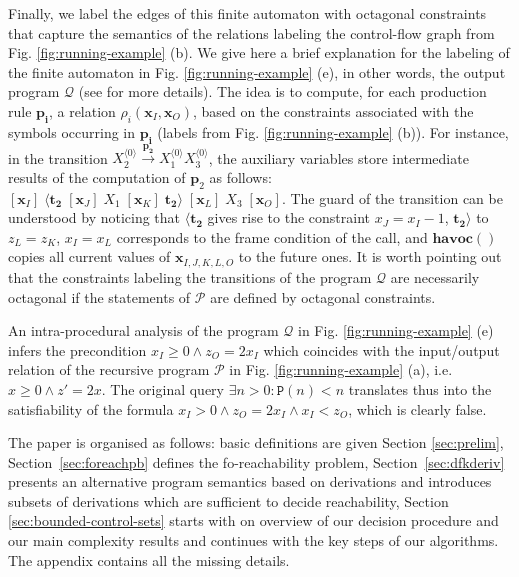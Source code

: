 \documentclass[final]{llncs}
\renewcommand{\vec}[1]{{\bf {#1}}}
\newcommand{\arrow}[2]{\xrightarrow{{\scriptscriptstyle #1}}}
\def\tuple#1{{\langle #1 \rangle}}
\renewcommand{\vec}[1]{{\mathbf {#1}}}
\begin{document}
Finally, we label the edges of this finite automaton with octagonal
constraints that capture the semantics of the relations labeling the
control-flow graph from Fig. \ref{fig:running-example} (b). We give
here a brief explanation for the labeling of the finite automaton in
Fig. \ref{fig:running-example} (e), in other words, the output
program \(\mathcal{Q}\) (see \cite{gik13} for more details). The idea
is to compute, for each production rule $\mathbf{p_i}$, a relation
$\rho_i(\vec{x}_I, \vec{x}_O)$, based on the constraints associated
with the symbols occurring in \(\mathbf{p_i}\) (labels from
Fig. \ref{fig:running-example} (b)). For instance, in the transition
$X_2^{\tuple{0}} \arrow{\mathbf{p_2}}{}
X_1^{\tuple{0}}X_3^{\tuple{0}}$, the auxiliary variables store
intermediate results of the computation of \(\mathbf{p}_2\) as
follows: \( [\vec{x}_I]\; \langle\!\mathbf{t_2} \;[\vec{x}_J]\;
X_1 \;[\vec{x}_K]\; \mathbf{t_2}\!\rangle \;[\vec{x}_L]\;
X_3 \;[\vec{x}_O]\). The guard of the transition can be understood by
noticing that $\langle\!\mathbf{t_2}$ gives rise to the constraint
$x_J=x_I-1$, $\mathbf{t_2}\!\rangle$ to $z_L=z_K$, $x_I=x_L$
corresponds to the frame condition of the call, and $\mathbf{havoc}()$
copies all current values of $\vec{x}_{I,J,K,L,O}$ to the future ones.
It is worth pointing out that the constraints labeling the transitions
of the program \(\mathcal{Q}\) are necessarily octagonal if the
statements of \(\mathcal{P}\) are defined by octagonal constraints.

An intra-procedural analysis of the program \(\mathcal{Q}\) in
Fig. \ref{fig:running-example} (e) infers the precondition
$x_I\geq0 \wedge z_O=2x_I$ which coincides with the input/output
relation of the recursive program \(\mathcal{P}\) in
Fig. \ref{fig:running-example} (a), i.e.\ $x \geq 0 \wedge z'=2x$. The
original query \(\exists n > 0 \colon \mathtt{P}(n) < n\) translates
thus into the satisfiability of the formula \(x_I > 0 \wedge
z_O=2x_I \wedge x_I<z_O\), which is clearly false.

The paper is organised as follows: basic definitions are given Section \ref{sec:prelim},
Section~\ref{sec:foreachpb} defines the fo-reachability problem, 
Section~\ref{sec:dfkderiv} presents an alternative program semantics based on derivations
and introduces subsets of derivations which are sufficient to decide reachability,
Section \ref{sec:bounded-control-sets} starts with on overview of our decision
procedure and our main complexity results and continues with the key steps of our algorithms. 
The appendix contains all the missing details.
\end{document}
